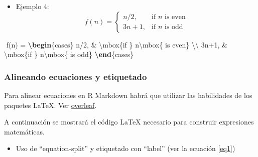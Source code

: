 \documentclass[12pt,a4paper,oneside,]{article}
\newenvironment{Shaded}{\begin{snugshade}}{\end{snugshade}}
\newcommand{\ExtensionTok}[1]{#1}
\newcommand{\KeywordTok}[1]{\textcolor[rgb]{0.13,0.29,0.53}{\textbf{#1}}}
\newcommand{\NormalTok}[1]{#1}
\newcommand{\SpecialCharTok}[1]{\textcolor[rgb]{0.00,0.00,0.00}{#1}}
\newcommand{\SpecialStringTok}[1]{\textcolor[rgb]{0.31,0.60,0.02}{#1}}
\providecommand{\tightlist}{%
  \setlength{\itemsep}{0pt}\setlength{\parskip}{0pt}}
\numberwithin{dummy}{section}
\theoremstyle{ocrenumbox}
\theoremstyle{blacknumex}
\theoremstyle{blacknumbox}
\theoremstyle{ocrenum}
\theoremstyle{ocrenum}
\begin{document}
\begin{itemize}
\tightlist
\item
  Ejemplo 4: \[
  f(n) = 
  \begin{cases} 
  n/2,  & \mbox{if } n\mbox{ is even} \\ 
  3n+1, & \mbox{if } n\mbox{ is odd} 
  \end{cases}
  \]
\end{itemize}

\begin{Shaded}
\begin{Highlighting}[]
\SpecialStringTok{$$}
\SpecialStringTok{f(n) = }
\KeywordTok{\textbackslash{}begin}\NormalTok{\{}\ExtensionTok{cases}\NormalTok{\}}\SpecialStringTok{ }
\SpecialStringTok{  n/2,  \& }\SpecialCharTok{\textbackslash{}mbox}\NormalTok{\{if \}}\SpecialStringTok{ n}\SpecialCharTok{\textbackslash{}mbox}\SpecialStringTok{\{ is even\} }\SpecialCharTok{\textbackslash{}\textbackslash{}}\SpecialStringTok{ }
\SpecialStringTok{  3n+1, \& }\SpecialCharTok{\textbackslash{}mbox}\NormalTok{\{if \}}\SpecialStringTok{ n}\SpecialCharTok{\textbackslash{}mbox}\SpecialStringTok{\{ is odd\} }
\KeywordTok{\textbackslash{}end}\NormalTok{\{}\ExtensionTok{cases}\NormalTok{\}}
\SpecialStringTok{$$}
\end{Highlighting}
\end{Shaded}

\hypertarget{etiquetadomatematico}{%
\subsubsection{Alineando ecuaciones y
etiquetado}\label{etiquetadomatematico}}

Para alinear ecuaciones en R Markdown habrá que utilizar las habilidades
de los paquetes LaTeX. Ver
\href{https://www.overleaf.com/learn/latex/Aligning_equations_with_amsmath}{overleaf}.

A continuación se mostrará el código LaTeX necesario para construir
expresiones matemáticas.

\begin{itemize}
\tightlist
\item
  Uso de ``equation-split'' y etiquetado con ``label'' (ver la ecuación
  \ref{eq1})
\end{itemize}
\end{document}
